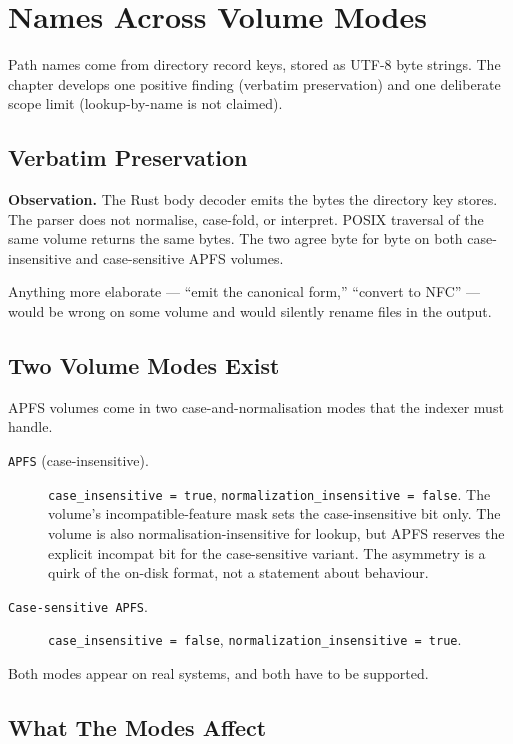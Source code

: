 \chapter{Names Across Volume Modes}

Path names come from directory record keys, stored as UTF-8 byte
strings. The chapter develops one positive finding (verbatim
preservation) and one deliberate scope limit (lookup-by-name is
not claimed).

\section{Verbatim Preservation}

\textbf{Observation.} The Rust body decoder emits the bytes the
directory key stores. The parser does not normalise, case-fold, or
interpret. POSIX traversal of the same volume returns the same
bytes. The two agree byte for byte on both case-insensitive and
case-sensitive APFS volumes.

Anything more elaborate --- ``emit the canonical form,'' ``convert
to NFC'' --- would be wrong on some volume and would silently
rename files in the output.

\section{Two Volume Modes Exist}

APFS volumes come in two case-and-normalisation modes that the
indexer must handle.

\begin{description}
  \item[\texttt{APFS} (case-insensitive).]
    \texttt{case\_insensitive = true},
    \texttt{normalization\_insensitive = false}. The volume's
    incompatible-feature mask sets the case-insensitive bit only.
    The volume is also normalisation-insensitive for lookup, but
    APFS reserves the explicit incompat bit for the case-sensitive
    variant. The asymmetry is a quirk of the on-disk format, not a
    statement about behaviour.
  \item[\texttt{Case-sensitive APFS}.]
    \texttt{case\_insensitive = false},
    \texttt{normalization\_insensitive = true}.
\end{description}

Both modes appear on real systems, and both have to be supported.

\section{What The Modes Affect}

